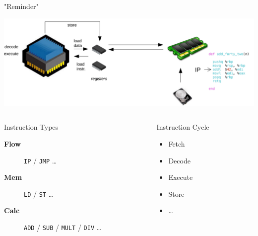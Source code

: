 \documentclass[presentation]{beamer}
\begin{document}
\begin{frame}[label={sec:orgf7e0255},fragile]{"Reminder"}
 \begin{center}
\includegraphics[width=.8\textwidth]{./images/cpu.png}
\end{center}
\pause
\begin{columns}
\begin{column}{.70\columnwidth}
\begin{block}{Instruction Types}
\begin{description}
\item[{\bf \black Flow}] \texttt{IP} / \texttt{JMP} \ldots{} \hfill
\item[{\bf \black Mem}] \texttt{LD} / \texttt{ST} \ldots{}  \hfill
\item[{\bf \black Calc}] \texttt{ADD} / \texttt{SUB} / \texttt{MULT} / \texttt{DIV} \ldots{} \hfill
\pause
\end{description}
\end{block}
\end{column}
\begin{column}{.29\columnwidth}
\begin{block}{Instruction Cycle}
\begin{itemize}
\item \small Fetch
\item \small Decode
\item \small Execute
\item \small Store
\item \small \ldots{}
\end{itemize}
\end{block}
\end{column}
\end{columns}
\end{frame}
\end{document}
